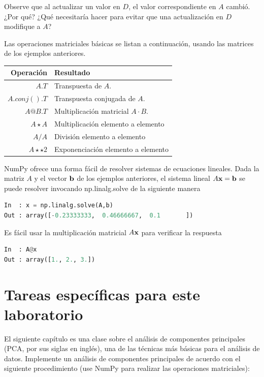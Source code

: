 Observe que al actualizar un valor en $D$, el valor correspondiente en $A$ cambió. ¿Por qué? ¿Qué necesitaría hacer para evitar que una actualización en $D$ modifique a $A$? \QA

Las operaciones matriciales básicas se listan a continuación, usando las matrices de los ejemplos anteriores.
\vs

\begin{tabular}{r|l}
Operación 		& Resultado \\
\hline
$A.T$ 	&  Transpuesta de $A$.\\
$A.conj().T$ 	&  Transpuesta conjugada de $A$.\\
$A@B.T$ 			&  Multiplicación matricial $A \cdot B$. \\
$A\star A$ 		&  Multiplicación elemento a elemento\\
$A/A$ 		&  División elemento a elemento\\
$A\star\star 2$ 		&  Exponenciación elemento a elemento\\
\hline
\end{tabular}

\vs

NumPy ofrece una forma fácil de resolver sistemas de ecuaciones lineales. Dada la matriz $A$ y el vector $\textbf{b}$ de los ejemplos anteriores, el sistema lineal $A\textbf{x} = \textbf{b}$ se puede resolver invocando {\s np.linalg.solve} de la siguiente manera

\begin{lstlisting}[language=Python]
In 	: x = np.linalg.solve(A,b)
Out : array([-0.23333333,  0.46666667,  0.1       ])
\end{lstlisting}

Es fácil usar la multiplicación matricial $A\textbf{x}$ para verificar la respuesta

\begin{lstlisting}[language=Python]
In 	: A@x
Out : array([1., 2., 3.])
\end{lstlisting}


\section{Tareas específicas para este laboratorio}
El siguiente capítulo es una clase sobre el análisis de componentes principales (PCA, por sus siglas en inglés), una de las técnicas más básicas para el análisis de datos. Implemente un análisis de componentes principales de acuerdo con el siguiente procedimiento (use NumPy para realizar las operaciones matriciales):

